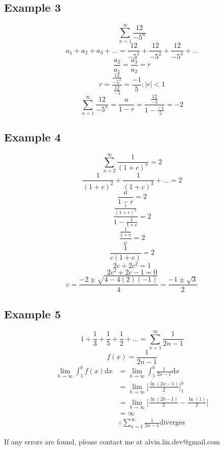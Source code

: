 \documentclass[letterpaper, 12pt]{article}
\newcommand*{\diff}{\mathrm{d}}
\begin{document}
\subsection*{Example 3}
\[ \sum_{n=1}^{\infty}\frac{12}{-5^{n}} \]
\[ a_{1}+a_{2}+a_{3}+... =
   \frac{12}{-5^{1}}+\frac{12}{-5^{2}}+\frac{12}{-5^{3}}+... \]
\[ \frac{a_{2}}{a_{1}} = \frac{a_{3}}{a_{2}} = r \]
\[ r = \frac{\frac{12}{-5^{2}}}{\frac{12}{-5}} = \frac{-1}{5}; |r| < 1 \]
\[ \sum_{n=1}^{\infty}\frac{12}{-5^{n}} = \frac{a}{1-r} =
   \frac{\frac{12}{-5}}{1-\frac{-1}{5}} = -2 \]

\subsection*{Example 4}
\[ \sum_{n=2}^{\infty}\frac{1}{(1+c)^{n}} = 2 \]
\[ \frac{1}{(1+c)^{2}}+\frac{1}{(1+c)^{3}}+... = 2 \]
\[ \frac{a}{1-r} = 2 \]
\[ \frac{\frac{1}{(1+c)^{2}}}{1-\frac{1}{1+c}} = 2 \]
\[ \frac{\frac{1}{1+c}}{c} = 2 \]
\[ \frac{1}{c(1+c)} = 2 \]
\[ 2c+2c^{2} = 1 \]
\[ 2c^{2}+2c-1 = 0 \]
\[ c = \frac{-2\pm\sqrt{4-4(2)(-1)}}{4} = \frac{-1\pm\sqrt{3}}{2} \]

\subsection*{Example 5}
\[ 1+\frac{1}{3}+\frac{1}{5}+\frac{1}{2}+... =
   \sum_{n=1}^{\infty}\frac{1}{2n-1} \]
\[ f(x) = \frac{1}{2n-1} \]
\begin{align*}
  \lim_{b\to\infty}\int_{1}^{b}f(x)\diff{x} &=
    \lim_{b\to\infty}\int_{1}^{b}\frac{1}{2x-1}\diff{x} \\
  &= \lim_{b\to\infty}\bigg[\frac{\ln(2x-1)}{2}\bigg]_{1}^{b} \\
  &= \lim_{b\to\infty}\bigg[\frac{\ln(2b-1)}{2}-\frac{\ln(1)}{2}\bigg] \\
  &= \infty \\
  & \therefore \sum_{n=1}^{\infty}\frac{1}{2n-1} \mathrm{diverges}
\end{align*}

\begin{center}
  If any errors are found, please contact me at alvin.lin.dev@gmail.com
\end{center}
\end{document}
